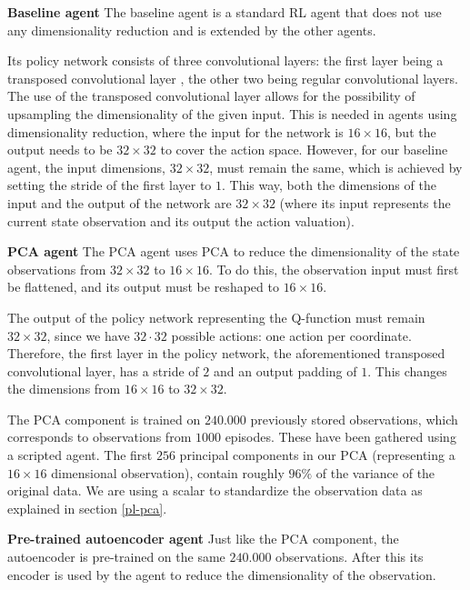 \noindent \textbf{Baseline agent}\newline
\noindent The baseline agent is a standard RL agent that does not use any dimensionality reduction and is extended by the other agents.

Its policy network consists of three convolutional layers: the first layer being a transposed convolutional layer \cite{transpose}, the other two being regular convolutional layers. The use of the transposed convolutional layer allows for the possibility of upsampling the dimensionality of the given input. This is needed in agents using dimensionality reduction, where the input for the network is $16 \times 16$, but the output needs to be $32 \times 32$ to cover the action space. However, for our baseline agent, the input dimensions, $32 \times 32$, must remain the same, which is achieved by setting the stride of the first layer to $1$. This way, both the dimensions of the input and the output of the network are $32 \times 32$ (where its input represents the current state observation and its output the action valuation).\newline

\noindent \textbf{PCA agent}\newline
\noindent The PCA agent uses PCA to reduce the dimensionality of the state observations from $32 \times 32$ to $16 \times 16$. To do this, the observation input must first be flattened, and its output must be reshaped to $16 \times 16$.

The output of the policy network representing the Q-function must remain $32 \times 32$, since we have $32 \cdot 32$ possible actions: one action per coordinate. Therefore, the first layer in the policy network, the aforementioned transposed convolutional layer, has a stride of $2$ and an output padding of $1$. This changes the dimensions from $16 \times 16$ to $32 \times 32$. 

The PCA component is trained on $240.000$ previously stored observations, which corresponds to observations from $1000$ episodes. These have been gathered using a scripted agent. The first $256$ principal components in our PCA (representing a $16 \times 16$ dimensional observation), contain roughly $96\%$ of the variance of the original data. We are using a scalar to standardize the observation data as explained in section \ref{pl-pca}. \newline

\noindent \textbf{Pre-trained autoencoder agent}\newline
\noindent Just like the PCA component, the autoencoder is pre-trained on the same $240.000$ observations. After this its encoder is used by the agent to reduce the dimensionality of the observation. 

